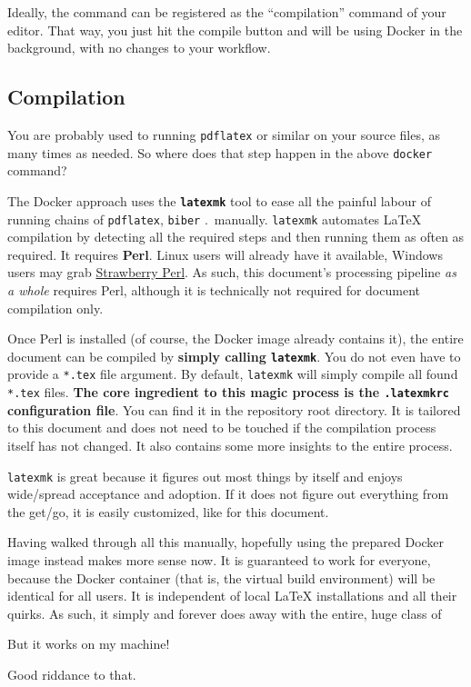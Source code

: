 Ideally, the command can be registered as the \enquote{compilation} command of your
editor.
That way, you just hit the compile button and will be using Docker in the background,
with no changes to your workflow.

\subsection{Compilation}
\label{ch:compilation_steps}

You are probably used to running \texttt{pdflatex} or similar on your source files,
as many times as needed.
So where does that step happen in the above \texttt{docker} command?

The Docker approach uses the \textbf{\texttt{latexmk}} tool to ease all the painful labour
of running chains of \texttt{pdflatex}, \texttt{biber} .\ manually.
\texttt{latexmk} automates \LaTeX{} compilation by detecting all the required
steps and then running them as often as required.
It requires \textbf{Perl}.
Linux users will already have it available, Windows users may grab
\href{http://strawberryperl.com/}{Strawberry Perl}.
As such, this document's processing pipeline \emph{as a whole} requires Perl,
although it is technically not required for document compilation only.

Once Perl is installed (of course, the Docker image already contains it),
the entire document can be compiled by \textbf{simply calling \texttt{latexmk}}.
You do not even have to provide a \texttt{*.tex} file argument.
By default, \texttt{latexmk} will simply compile all found \texttt{*.tex} files.
\textbf{The core ingredient to this magic process is the \texttt{.latexmkrc} configuration file}.
You can find it in the repository root directory.
It is tailored to this document and does not need to be touched if the compilation
process itself has not changed.
It also contains some more insights to the entire process.

\texttt{latexmk} is great because it figures out most things by itself and enjoys
wide\-/spread acceptance and adoption.
If it does not figure out everything from the get\-/go, it is easily customized,
like for this document.

Having walked through all this manually, hopefully using the prepared Docker image
instead makes more sense now.
It is guaranteed to work for everyone, because the Docker container (that is, the
virtual build environment) will be identical for all users.
It is independent of local \LaTeX{} installations and all their quirks.
As such, it simply and forever does away with the entire, huge class of
\begin{displayquote}
  But it works on my machine!
\end{displayquote}
Good riddance to that.

